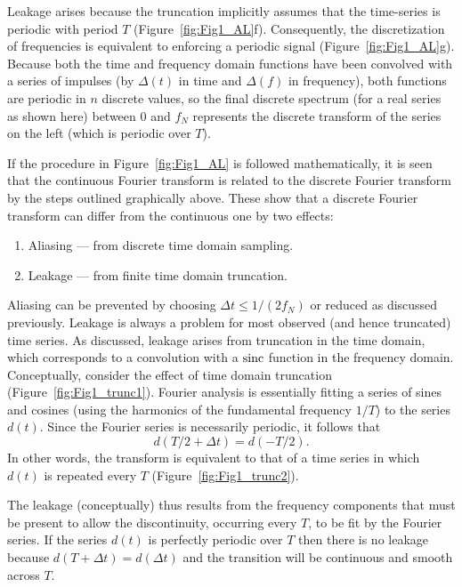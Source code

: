 Leakage arises because the truncation implicitly 
assumes that the time-series is periodic with period $T$ (Figure~\ref{fig:Fig1_AL}f).  Consequently, the
discretization of frequencies is equivalent to enforcing a periodic signal (Figure~\ref{fig:Fig1_AL}g).
Because both the time and frequency domain functions have been convolved with a series of 
impulses (by $\Delta(t)$ in time and $\Delta(f)$ in frequency), both functions are periodic in $n$ discrete values, so 
the final discrete spectrum  (for a real series as shown here) between $0$ and $f_N$ represents the 
discrete transform of the series on the left (which is periodic over $T$).

	If the procedure in Figure~\ref{fig:Fig1_AL} is followed mathematically, it is seen that the continuous Fourier 
transform is related to the discrete Fourier transform by the steps outlined graphically above.  
These show that a discrete Fourier transform can differ from the continuous one by two effects:
\begin{enumerate}
\item Aliasing --- from discrete time domain sampling.
\item Leakage --- from finite time domain truncation.
\end{enumerate}
Aliasing can be prevented by choosing $\Delta t \leq 1/(2 f_N)$ or reduced as discussed previously.  Leakage is 
always a problem for most observed (and hence truncated) time series.
As discussed, leakage arises from truncation in the time domain, which corresponds to a 
convolution with a $\operatorname{sinc}$ function in the frequency domain.  Conceptually, consider the effect of time domain 
truncation (Figure~\ref{fig:Fig1_trunc1}).
Fourier analysis is essentially fitting a series of sines and cosines (using the harmonics of the 
fundamental frequency $1/T$) to the series $d(t)$.  Since the Fourier series is necessarily periodic, it 
follows that
\begin{equation}
d(T/2 + \Delta t) = d( - T/2).
\end{equation}
In other words, the transform is equivalent to that of a time series in which $d(t)$ is repeated every $T$ (Figure~\ref{fig:Fig1_trunc2}).
 
\noindent
The leakage (conceptually) thus results from the frequency components that must be present to 
allow the discontinuity, occurring every $T$, to be fit by the Fourier series.  If the series $d(t)$ 
is perfectly periodic over $T$ then there is no leakage because $d(T + \Delta t) = d(\Delta t)$ and the transition will be 
continuous and smooth across $T$. 


